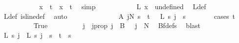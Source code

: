 \begin{isabellebody}
\ \ \ \ \ \ \ \ \isamarkupfalse%
\ \isamarkupfalse%
\ {\isachardoublequoteopen}x\ {\isasymnotin}\ {\isacharbraceleft}{\kern0pt}{\isachardot}{\kern0pt}{\isachardot}{\kern0pt}{\isacharless}{\kern0pt}t{\isacharbraceright}{\kern0pt}\ {\isasymand}\ x\ {\isasymnoteq}\ t{\isachardoublequoteclose}\ \isamarkupfalse%
\ simp\isanewline
\ \ \ \ \ \ \ \ \isamarkupfalse%
\ \isamarkupfalse%
\ {\isachardoublequoteopen}L{\isacharprime}{\kern0pt}\ x\ {\isacharequal}{\kern0pt}\ undefined{\isachardoublequoteclose}\ \isamarkupfalse%
\ L{\isacharunderscore}{\kern0pt}def\ \isamarkupfalse%
\ L{\isacharprime}{\kern0pt}{\isacharunderscore}{\kern0pt}def\ is{\isacharunderscore}{\kern0pt}line{\isacharunderscore}{\kern0pt}def\ \isamarkupfalse%
\ auto\isanewline
\ \ \ \ \ \ \isamarkupfalse%
\isanewline
\ \ \ \ \ \ \isamarkupfalse%
\ A{}{\isacharcolon}{\kern0pt}\ {\isachardoublequoteopen}{\isacharparenleft}{\kern0pt}{\isasymexists}j{\isacharless}{\kern0pt}N{\isacharprime}{\kern0pt}{\isachardot}{\kern0pt}\ {\isacharparenleft}{\kern0pt}{\isasymforall}s\ {\isacharless}{\kern0pt}\ {\isacharparenleft}{\kern0pt}t\ {\isacharplus}{\kern0pt}\ {}{\isacharparenright}{\kern0pt}{\isachardot}{\kern0pt}\ L{\isacharprime}{\kern0pt}\ s\ j\ {\isacharequal}{\kern0pt}\ s{\isacharparenright}{\kern0pt}{\isacharparenright}{\kern0pt}{\isachardoublequoteclose}\isanewline
\ \ \ \ \ \ \isamarkupfalse%
\ {\isacharparenleft}{\kern0pt}cases\ {\isachardoublequoteopen}t\ {\isacharequal}{\kern0pt}\ {}{\isachardoublequoteclose}{\isacharparenright}{\kern0pt}\isanewline
\ \ \ \ \ \ \ \ \isamarkupfalse%
\ True\isanewline
\ \ \ \ \ \ \ \ \isamarkupfalse%
\ j\ \ j{\isacharunderscore}{\kern0pt}prop{\isacharcolon}{\kern0pt}\ {\isachardoublequoteopen}j\ {\isasymin}\ B\ {}\ {\isasymand}\ j\ {\isacharless}{\kern0pt}\ N{\isacharprime}{\kern0pt}{\isachardoublequoteclose}\ \isamarkupfalse%
\ Bf{\isacharunderscore}{\kern0pt}defs\ \isamarkupfalse%
\ blast\isanewline
\ \ \ \ \ \ \ \ \isamarkupfalse%
\ \isamarkupfalse%
\ {\isachardoublequoteopen}L{\isacharprime}{\kern0pt}\ s\ j\ {\isacharequal}{\kern0pt}\ L\ s\ j{\isachardoublequoteclose}\ \ {\isachardoublequoteopen}s\ {\isacharless}{\kern0pt}\ t{\isachardoublequoteclose}\ \ s\ \isamarkupfalse%

\end{isabellebody}

